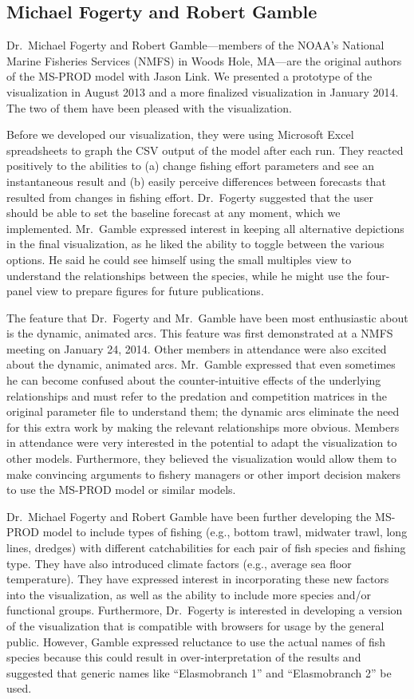 \subsection{Michael Fogerty and Robert Gamble} %

Dr.\ Michael Fogerty and Robert Gamble---members of the NOAA's National Marine Fisheries Services (NMFS) in Woods Hole, MA---are the original authors of the MS-PROD model with Jason Link.  We presented a prototype of the visualization in August 2013 and a more finalized visualization in January 2014.  The two of them have been pleased with the visualization.

Before we developed our visualization, they were using Microsoft Excel spreadsheets to graph the CSV output of the model after each run.  They reacted positively to the abilities to (a) change fishing effort parameters and see an instantaneous result and (b) easily perceive differences between forecasts that resulted from changes in fishing effort.  Dr.\ Fogerty suggested that the user should be able to set the baseline forecast at any moment, which we implemented.  Mr.\ Gamble expressed interest in keeping all alternative depictions in the final visualization, as he liked the ability to toggle between the various options.  He said he could see himself using the small multiples view to understand the relationships between the species, while he might use the four-panel view to prepare figures for future publications.

The feature that Dr.\ Fogerty and Mr.\ Gamble have been most enthusiastic about is the dynamic, animated arcs.  This feature was first demonstrated at a NMFS meeting on January 24, 2014.  Other members in attendance were also excited about the dynamic, animated arcs.  Mr.\ Gamble expressed that even sometimes he can become confused about the counter-intuitive effects of the underlying relationships and must refer to the predation and competition matrices in the original parameter file to understand them; the dynamic arcs eliminate the need for this extra work by making the relevant relationships more obvious.  Members in attendance were very interested in the potential to adapt the visualization to other models.  Furthermore, they believed the visualization would allow them to make convincing arguments to fishery managers or other import decision makers to use the MS-PROD model or similar models.

Dr.\ Michael Fogerty and Robert Gamble have been further developing the MS-PROD model to include types of fishing (e.g., bottom trawl, midwater trawl, long lines, dredges) with different catchabilities for each pair of fish species and fishing type.  They have also introduced climate factors (e.g., average sea floor temperature).  They have expressed interest in incorporating these new factors into the visualization, as well as the ability to include more species and/or functional groups.  Furthermore, Dr.\ Fogerty is interested in developing a version of the visualization that is compatible with browsers for usage by the general public.  However, Gamble expressed reluctance to use the actual names of fish species because this could result in over-interpretation of the results and suggested that generic names like ``Elasmobranch 1'' and ``Elasmobranch 2'' be used.

